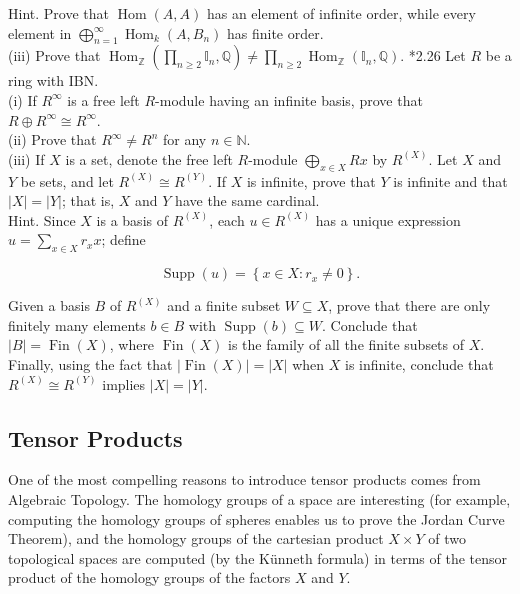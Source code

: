 \documentclass[10pt, letterpaper]{article}
\begin{document}
Hint. Prove that $\operatorname{Hom}(A, A)$ has an element of infinite order, while every element in $\bigoplus_{n=1}^{\infty} \operatorname{Hom}_{k}\left(A, B_{n}\right)$ has finite order.\\
(iii) Prove that $\operatorname{Hom}_{\mathbb{Z}}\left(\prod_{n \geq 2} \mathbb{I}_{n}, \mathbb{Q}\right) \neq \prod_{n \geq 2} \operatorname{Hom}_{\mathbb{Z}}\left(\mathbb{I}_{n}, \mathbb{Q}\right)$. *2.26 Let $R$ be a ring with IBN.\\
(i) If $R^{\infty}$ is a free left $R$-module having an infinite basis, prove that $R \oplus R^{\infty} \cong R^{\infty}$.\\
(ii) Prove that $R^{\infty} \neq R^{n}$ for any $n \in \mathbb{N}$.\\
(iii) If $X$ is a set, denote the free left $R$-module $\bigoplus_{x \in X} R x$ by $R^{(X)}$. Let $X$ and $Y$ be sets, and let $R^{(X)} \cong R^{(Y)}$. If $X$ is infinite, prove that $Y$ is infinite and that $|X|=|Y|$; that is, $X$ and $Y$ have the same cardinal.\\
Hint. Since $X$ is a basis of $R^{(X)}$, each $u \in R^{(X)}$ has a unique expression $u=\sum_{x \in X} r_{x} x$; define

$$
\operatorname{Supp}(u)=\left\{x \in X: r_{x} \neq 0\right\} .
$$

Given a basis $B$ of $R^{(X)}$ and a finite subset $W \subseteq X$, prove that there are only finitely many elements $b \in B$ with $\operatorname{Supp}(b) \subseteq W$. Conclude that $|B|=\operatorname{Fin}(X)$, where $\operatorname{Fin}(X)$ is the family of all the finite subsets of $X$. Finally, using the fact that $|\operatorname{Fin}(X)|=|X|$ when $X$ is infinite, conclude that $R^{(X)} \cong R^{(Y)}$ implies $|X|=|Y|$.




\pagebreak


\subsection*{Tensor Products}
One of the most compelling reasons to introduce tensor products comes from Algebraic Topology. The homology groups of a space are interesting (for example, computing the homology groups of spheres enables us to prove the Jordan Curve Theorem), and the homology groups of the cartesian product $X \times Y$ of two topological spaces are computed (by the Künneth formula) in terms of the tensor product of the homology groups of the factors $X$ and $Y$.
\end{document}
